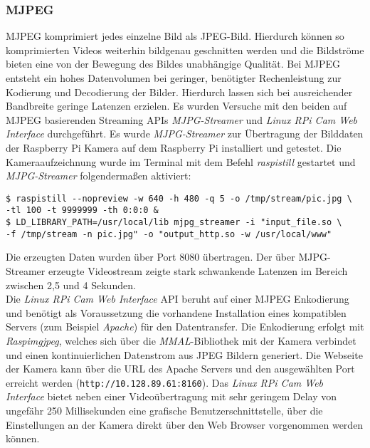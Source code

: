 \documentclass[BMR,Bachelor,ngerman]{twbook}%
\begin{document}
\subsubsection{\acf{MJPEG}} 
\ac{MJPEG} komprimiert jedes einzelne Bild als \ac{JPEG}-Bild. Hierdurch können so komprimierten Videos weiterhin bildgenau geschnitten werden und die Bildströme bieten eine von der Bewegung des Bildes unabhängige Qualität. Bei \ac{MJPEG} entsteht ein hohes Datenvolumen bei geringer, benötigter Rechenleistung zur Kodierung und Decodierung der Bilder. Hierdurch lassen sich bei ausreichender Bandbreite geringe Latenzen erzielen. Es wurden Versuche mit den beiden auf \ac{MJPEG} basierenden Streaming \acp{API} \emph{MJPG-Streamer} und \emph{Linux RPi Cam Web Interface} durchgeführt. 
Es wurde \emph{MJPG-Streamer} zur Übertragung der Bilddaten der Raspberry Pi Kamera auf dem Raspberry Pi installiert und getestet. Die Kameraaufzeichnung wurde im Terminal mit dem Befehl \emph{raspistill} gestartet und \emph{MJPG-Streamer} folgendermaßen aktiviert:
\begin{verbatim}
$ raspistill --nopreview -w 640 -h 480 -q 5 -o /tmp/stream/pic.jpg \
-tl 100 -t 9999999 -th 0:0:0 &
$ LD_LIBRARY_PATH=/usr/local/lib mjpg_streamer -i "input_file.so \
-f /tmp/stream -n pic.jpg" -o "output_http.so -w /usr/local/www"\end{verbatim}
%
Die erzeugten Daten wurden über Port 8080 übertragen. Der über MJPG-Streamer erzeugte Videostream zeigte stark schwankende Latenzen im Bereich zwischen 2,5 und 4 Sekunden.\\\newline
Die \emph{Linux RPi Cam Web Interface} \ac{API} beruht auf einer MJPEG Enkodierung und benötigt als Voraussetzung die vorhandene Installation eines kompatiblen Servers (zum Beispiel \emph{Apache}) für den Datentransfer. Die Enkodierung erfolgt mit \emph{Raspimgjpeg}, welches sich über die \emph{MMAL}-Bibliothek mit der Kamera verbindet und einen kontinuierlichen Datenstrom aus \ac{JPEG} Bildern generiert. Die Webseite der Kamera kann über die \ac{URL} des Apache Servers und den ausgewählten Port erreicht werden (\verb+http://10.128.89.61:8160+). %
Das \emph{Linux RPi Cam Web Interface} bietet neben einer Videoübertragung mit sehr geringem Delay von ungefähr 250 Millisekunden eine grafische Benutzerschnittstelle, über die Einstellungen an der Kamera direkt über den Web Browser vorgenommen werden können.
%
\end{document}
